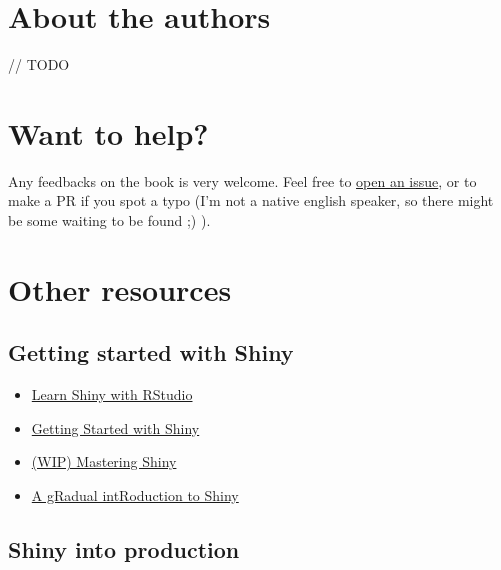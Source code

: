 \documentclass[]{book}
\providecommand{\tightlist}{%
  \setlength{\itemsep}{0pt}\setlength{\parskip}{0pt}}
\begin{document}
\hypertarget{about-the-authors}{%
\section*{About the authors}\label{about-the-authors}}

// TODO

\hypertarget{want-to-help}{%
\section*{Want to help?}\label{want-to-help}}

Any feedbacks on the book is very welcome. Feel free to \href{https://github.com/ThinkR-open/building-shiny-apps-workflow/issues}{open an issue}, or to make a PR if you spot a typo (I'm not a native english speaker, so there might be some waiting to be found ;) ).

\hypertarget{other-resources}{%
\section*{Other resources}\label{other-resources}}

\hypertarget{getting-started-with-shiny}{%
\subsection*{Getting started with Shiny}\label{getting-started-with-shiny}}

\begin{itemize}
\tightlist
\item
  \href{https://shiny.rstudio.com/tutorial/}{Learn Shiny with RStudio}
\item
  \href{https://ourcodingclub.github.io/2017/03/07/shiny.html}{Getting Started with Shiny}
\item
  \href{https://github.com/jcheng5/shiny-book}{(WIP) Mastering Shiny}
\item
  \href{https://laderast.github.io/gradual_shiny/}{A gRadual intRoduction to Shiny}
\end{itemize}

\hypertarget{shiny-into-production}{%
\subsection*{Shiny into production}\label{shiny-into-production}}
\end{document}
